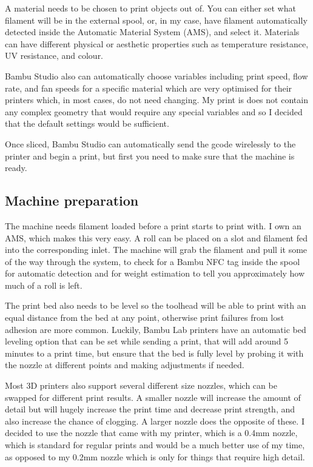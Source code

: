 \documentclass[11pt,a4paper]{article}
\begin{document}
\bigbreak\noindent
A material needs to be chosen to print objects out of. You can either set what filament will be in the external spool, or, in my case, have filament automatically detected inside the Automatic Material System (AMS), and select it. Materials can have different physical or aesthetic properties such as temperature resistance, UV resistance, and colour.

\bigbreak\noindent
Bambu Studio also can automatically choose variables including print speed, flow rate, and fan speeds for a specific material which are very optimised for their printers which, in most cases, do not need changing. My print is does not contain any complex geometry that would require any special variables and so I decided that the default settings would be sufficient.

\bigbreak\noindent
Once sliced, Bambu Studio can automatically send the gcode wirelessly to the printer and begin a print, but first you need to make sure that the machine is ready.

\subsection{Machine preparation}

The machine needs filament loaded before a print starts to print with. I own an AMS, which makes this very easy. A roll can be placed on a slot and filament fed into the corresponding inlet. The machine will grab the filament and pull it some of the way through the system, to check for a Bambu NFC tag inside the spool for automatic detection and for weight estimation to tell you approximately how much of a roll is left.

The print bed also needs to be level so the toolhead will be able to print with an equal distance from the bed at any point, otherwise print failures from lost adhesion are more common. Luckily, Bambu Lab printers have an automatic bed leveling option that can be set while sending a print, that will add around 5 minutes to a print time, but ensure that the bed is fully level by probing it with the nozzle at different points and making adjustments if needed.

\bigbreak\noindent
Most 3D printers also support several different size nozzles, which can be swapped for different print results. A smaller nozzle will increase the amount of detail but will hugely increase the print time and decrease print strength, and also increase the chance of clogging. A larger nozzle does the opposite of these. I decided to use the nozzle that came with my printer, which is a 0.4mm nozzle, which is standard for regular prints and would be a much better use of my time, as opposed to my 0.2mm nozzle which is only for things that require high detail. 
\end{document}
